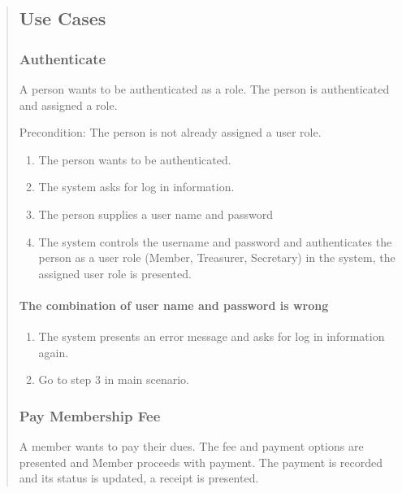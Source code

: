 \begin{quote}
\subsection{Use Cases}\label{use-cases}

\subsubsection{Authenticate}\label{usecase1}

A person wants to be authenticated as a role. The person is authenticated and
assigned a role.

Precondition: The person is not already assigned a user role.

\begin{enumerate}
  \tightlist
  \item
    The person wants to be authenticated.
  \item
    The system asks for log in information.
  \item
    The person supplies a user name and password
  \item
    The system controls the username and password and authenticates the
    person as a user role (Member, Treasurer, Secretary) in the system,
    the assigned user role is presented.
\end{enumerate}

\paragraph{The combination of user name and password is wrong}
\begin{enumerate}
  \tightlist
  \item
    The system presents an error message and asks for log in information
    again.
  \item
    Go to step 3 in main scenario.
\end{enumerate}


\subsubsection{Pay Membership Fee}\label{usecase2}

A member wants to pay their dues. The fee and payment options are presented
and Member proceeds with payment. The payment is recorded and its status is
updated, a receipt is presented.


\end{quote}
